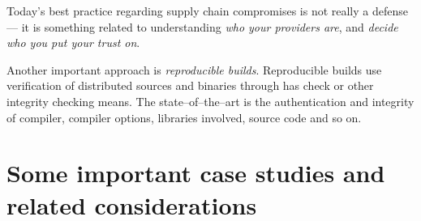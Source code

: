\documentclass[10pt]{extreport}
\begin{document}
Today's best practice regarding supply chain compromises is not really a
defense --- it is something related to understanding \emph{who your providers
are}, and \emph{decide who you put your trust on}.

Another important approach is \emph{reproducible builds}. Reproducible builds
use verification of distributed sources and binaries through has check or other
integrity checking means. The state--of--the--art is the authentication and
integrity of compiler, compiler options, libraries involved, source code and so
on.

\chapter{Some important case studies and related considerations}
\end{document}
